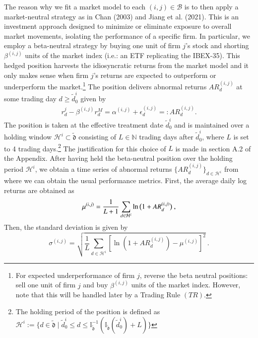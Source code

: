 \mx 
The reason why we fit a market model to each $(i,j)\in\mathcal B$ is to then apply a market-neutral strategy as in 
\cite{chan2003stock} Chan (2003)
and 
\cite{jiang2021pervasive} Jiang et al. (2021).
This is an investment approach designed to minimize or eliminate exposure to overall market movements, isolating the performance of a specific firm. 
% 
In particular, we employ a beta-neutral strategy by buying one unit of firm $j$'s stock and shorting $\beta^{(i,j)}$ units of the market index (i.e.: an ETF replicating the IBEX-35). 
%
This hedged position harvests the idiosyncratic returns from the market model and it only makes sense when firm $j$'s returns are expected to outperform or underperform the market.\footnote{
For expected underperformance of firm $j$, reverse the beta neutral positions: 
sell one unit of firm $j$ and buy $\beta^{(i,j)}$ units of the market index. However, note that this will be handled later by a Trading Rule $(TR)$.
\mx 
}
The position delivers abnormal returns $AR^{(i,j)}_{d}$ at some trading day $d\geq \tilde{d}_0^i$ given by
\begin{align*}
r_{d}^j -  \beta^{(i,j)} r_{d}^M = \alpha^{(i,j)} + \epsilon_{d}^{(i,j)} =: AR^{(i,j)}_{d}
.
\end{align*}
The position is taken at the effective treatment date $\tilde d_0^i$ and is maintained over a holding window $\mathcal H^i \subset \tilde{\mathfrak{d}}$ consisting of $L\in\mathbb{N}$ trading days after $\tilde d_0^i$, where $L$ is set to 4 trading days.\footnote{  
The holding period of the position is defined as 
$
\mathcal H^i:=
\{
d \in \tilde{\mathfrak{d}}
\mid 
\tilde{d}_0^i
\leq d \leq 
\mathbb{I}^{-1}_{\tilde{\mathfrak{d}}}(\mathbb{I}_{\tilde{\mathfrak{d}}}(\tilde d_0^i)+L)
\}
$}
The justification for this choice of $L$ is made in section A.2 of the Appendix. 
%
%
After having held the beta-neutral position over the holding period $\mathcal H^i$, we obtain a time series of abnormal returns $\{AR_{d}^{(i,j)}\}_{d\in\mathcal H^i}$ from where we can obtain the usual performance metrics. First, the average daily log returns are obtained as
$$
\mu^{(i,j)} = \frac{1}{{{L}}+1} 
\sum_{d\in \mathcal H^i}
\ln\big{(} 1+AR_d^{(i,j)} \big{)}
~,
$$
Then, the standard deviation is given by
$$
\sigma^{(i,j)}
=
\sqrt{
\frac{1}{{{L}}}
\sum_{d\in \mathcal H^i}
[
\ln(1+AR_d^{(i,j)}) - \mu^{(i,j)}
]
^2}
~.
$$

